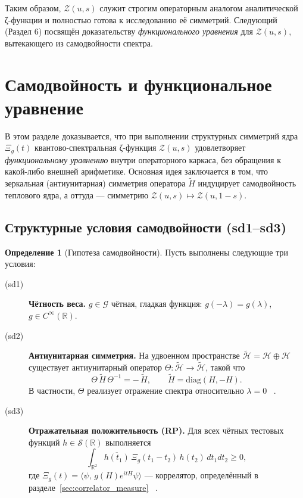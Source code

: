 \documentclass{article}
\numberwithin{equation}{section}
\theoremstyle{plain}
\theoremstyle{definition}
\newtheorem{definition}{Определение}
\theoremstyle{remark}
\def\infty{∞}\def\partial{∂}\def\sum{Σ}\def\int{∫}%
\begin{document}
\noindent
Таким образом, $\mathcal Z(u,s)$ служит строгим операторным аналогом аналитической ζ-функции и полностью готова к исследованию её симметрий.  
Следующий (Раздел 6) посвящён доказательству \emph{функционального уравнения} для $\mathcal Z(u,s)$, вытекающего из самодвойности спектра.

\clearpage

\section{Самодвойность и функциональное уравнение}
\label{sec:selfdual}

\noindent
В этом разделе доказывается, что при выполнении структурных симметрий ядра $\Xi_g(t)$
квантово-спектральная ζ-функция $\mathcal Z(u,s)$ удовлетворяет \emph{функциональному уравнению}
внутри операторного каркаса, без обращения к какой-либо внешней арифметике.  
Основная идея заключается в том, что зеркальная (антиунитарная) симметрия оператора $\widetilde H$
индуцирует самодвойность теплового ядра, а оттуда — симметрию $\mathcal Z(u,s)\mapsto \mathcal Z(u,1-s)$.

\subsection{Структурные условия самодвойности (sd1–sd3)}
\label{subsec:sd_conditions}

\begin{definition}[Гипотеза самодвойности]
\label{def:selfdual_hypothesis}
Пусть выполнены следующие три условия:
\begin{description}
  \item[(sd1)] \textbf{Чётность веса.}  
  $g\in\mathcal G$ чётная, гладкая функция: $g(-\lambda)=g(\lambda)$, $g\in C^\infty(\mathbb R)$.
  
  \item[(sd2)] \textbf{Антиунитарная симметрия.}  
  На удвоенном пространстве $\widetilde{\mathcal H}=\mathcal H\oplus\mathcal H$  
  существует антиунитарный оператор $\Theta:\widetilde{\mathcal H}\to\widetilde{\mathcal H}$, такой что
  \begin{equation}
  \label{eq:antiunitary}
  \Theta\,\widetilde H\,\Theta^{-1}=-\,\widetilde H,
  \qquad
  \widetilde H=\mathrm{diag}(H,-H).
  \end{equation}
  В частности, $\Theta$ реализует отражение спектра относительно $\lambda=0$ ~\cite{Wigner1959}.

  \item[(sd3)] \textbf{Отражательная положительность (RP).}  
  Для всех чётных тестовых функций $h\in\mathcal S(\mathbb R)$ выполняется
  \begin{equation}
  \label{eq:rp}
  \int_{\mathbb R^2} \overline{h(t_1)}\,\Xi_g(t_1-t_2)\,h(t_2)\,dt_1dt_2 \ge 0,
  \end{equation}
  где $\Xi_g(t)=\langle\psi,\,g(H)e^{itH}\psi\rangle$ — коррелятор, определённый в разделе~\ref{sec:correlator_measure} ~\cite{OsterwalderSchrader1973}.
\end{description}
\end{definition}
\end{document}
